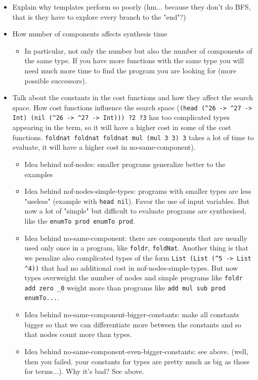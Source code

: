 \begin{itemize}
\begin{itemize}
\end{itemize}
\item Explain why templates perform so poorly (hm... because they don't do BFS, that is they have to explore every branch to the "end"?)
\item How number of components affects synthesis time
\begin{itemize}
\item In particular, not only the number but also the number of components of the same type. If you have more functions with the same type you will need much more time to find the program you are looking for (more possible successors).
\end{itemize} 
\item Talk about the constants in the cost functions and how they affect the search space.
How cost functions influence the search space (\lstinline!(head (^26 -> ^27 -> Int) (nil (^26 -> ^27 -> Int))) ?2 ?3! has too complicated types appearing in the term, so it will have a higher cost in some of the cost functions. \lstinline!foldnat foldnat foldnat mul (mul 3 3) 3! takes a lot of time to evaluate, it will have a higher cost in no-same-component).
\begin{itemize}
\item Idea behind nof-nodes: smaller programs generalize better to the examples
\item Idea behind nof-nodes-simple-types: programs with smaller types are less "useless" (example with \lstinline?head nil?). Favor the use of input variables. But now a lot of "simple" but difficult to evaluate programs are synthesised, like the \lstinline?enumTo prod enumTo prod?.
\item Idea behind no-same-component: there are components that are usually used only once in a program, like \lstinline?foldr?, \lstinline?foldNat?. Another thing is that we penalize also complicated types of the form \lstinline?List (List (^5 -> List ^4))? that had no additional cost in nof-nodes-simple-types. But now types overweight the number of nodes and simple programs like \lstinline?foldr add zero _0? weight more than programs like \lstinline?add mul sub prod enumTo...?.
\item Idea behind no-same-component-bigger-constants: make all constants bigger so that we can differentiate more between the constants and so that nodes count more than types.
\item Idea behind no-same-component-even-bigger-constants: see above. (well, then you failed. your constants for types are pretty much as big as those for terms...). Why it's bad? See above.

\end{itemize}
\end{itemize}
